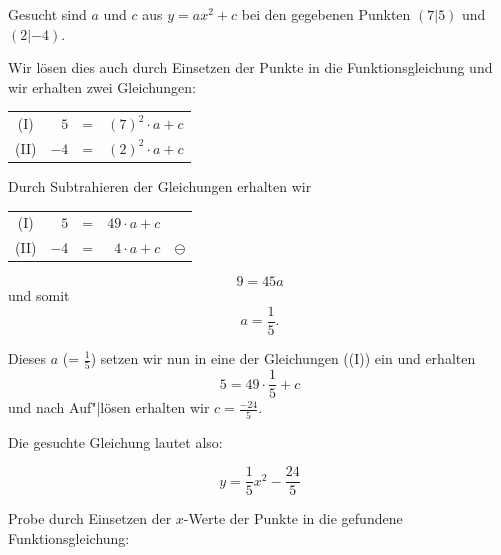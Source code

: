 \begin{rezept}{}{}
  Gesucht sind $a$ und $c$ aus $y = ax^2 + c$ bei den gegebenen
  Punkten $(7|5)$ und $(2|-4)$.

  Wir lösen dies auch durch Einsetzen der Punkte in die
  Funktionsgleichung und wir erhalten zwei Gleichungen:


  \begin{tabular}{c | r  c  r |}
    (I)  &  $5$ & = & $(7)^2\cdot{} a + c$ \\
    (II) & $-4$ & = &  $(2)^2\cdot{} a + c$ \\
  \end{tabular}

  Durch Subtrahieren der Gleichungen erhalten wir

  \begin{tabular}{c | r  c  r | c}
    (I)  &  $5$ & = & $49\cdot{} a + c$ & \,\\
    (II) & $-4$ & = &  $4\cdot{} a + c$ & $\ominus$\\
  \end{tabular}

  $$9 = 45a$$ und somit
  $$a =\frac{1}{5}.$$

  Dieses $a$ (= $\frac{1}{5}$) setzen wir nun in eine der Gleichungen
  (\zB (I)) ein und erhalten
  $$5=49\cdot{}\frac{1}{5} + c$$
  und nach Auf"|lösen erhalten wir $c=\frac{-24}{5}$.

  Die gesuchte Gleichung lautet also:

  $$y = \frac{1}{5}x^2 - \frac{24}{5}$$
\end{rezept}

Probe durch Einsetzen der $x$-Werte der Punkte in die gefundene Funktionsgleichung:

\newpage

